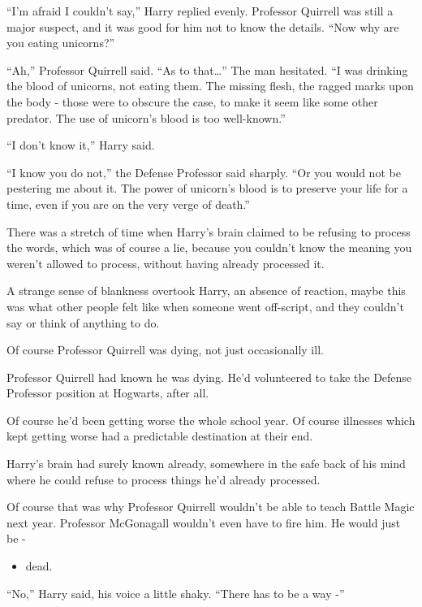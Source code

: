 ``I'm afraid I couldn't say,'' Harry replied evenly. Professor Quirrell
was still a major suspect, and it was good for him not to know the
details. ``Now why are you eating unicorns?''

``Ah,'' Professor Quirrell said. ``As to that\ldots{}'' The man
hesitated. ``I was drinking the blood of unicorns, not eating them. The
missing flesh, the ragged marks upon the body - those were to obscure
the case, to make it seem like some other predator. The use of unicorn's
blood is too well-known.''

``I don't know it,'' Harry said.

``I know you do not,'' the Defense Professor said sharply. ``Or you
would not be pestering me about it. The power of unicorn's blood is to
preserve your life for a time, even if you are on the very verge of
death.''

There was a stretch of time when Harry's brain claimed to be refusing to
process the words, which was of course a lie, because you couldn't know
the meaning you weren't allowed to process, without having already
processed it.

A strange sense of blankness overtook Harry, an absence of reaction,
maybe this was what other people felt like when someone went off-script,
and they couldn't say or think of anything to do.

Of course Professor Quirrell was dying, not just occasionally ill.

Professor Quirrell had known he was dying. He'd volunteered to take the
Defense Professor position at Hogwarts, after all.

Of course he'd been getting worse the whole school year. Of course
illnesses which kept getting worse had a predictable destination at
their end.

Harry's brain had surely known already, somewhere in the safe back of
his mind where he could refuse to process things he'd already processed.

Of course that was why Professor Quirrell wouldn't be able to teach
Battle Magic next year. Professor McGonagall wouldn't even have to fire
him. He would just be -

\begin{itemize}
\itemsep1pt\parskip0pt
\item
  dead.
\end{itemize}

``No,'' Harry said, his voice a little shaky. ``There has to be a way
-''

